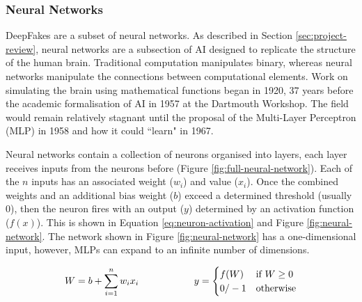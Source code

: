 \subsubsection{Neural Networks}

DeepFakes are a subset of neural networks. As described in Section \ref{sec:project-review}, neural networks are a subsection of AI designed to replicate the structure of the human brain\cite{islam2019overview}. Traditional computation manipulates binary, whereas neural networks manipulate the connections between computational elements. Work on simulating the brain using mathematical functions began in 1920\cite{brush1967history}, 37 years before the academic formalisation of AI in 1957 at the Dartmouth Workshop\cite{crevier1993ai}. The field would remain relatively stagnant until the proposal of the Multi-Layer Perceptron (MLP) in 1958\cite{rosenblatt1958perceptron} and how it could ``learn" in 1967\cite{ivakhnenko1967cybernetics}.

Neural networks contain a collection of neurons organised into layers, each layer receives inputs from the neurons before (Figure \ref{fig:full-neural-network}). Each of the $n$ inputs has an associated weight ($w_i$) and value ($x_i$). Once the combined weights and an additional bias weight ($b$) exceed a determined threshold (usually 0), then the neuron fires with an output ($y$) determined by an activation function ($f(x)$). This is shown in Equation \ref{eq:neuron-activation} and Figure \ref{fig:neural-network}. The network shown in Figure \ref{fig:neural-network} has a one-dimensional input, however, MLPs can expand to an infinite number of dimensions.

\begin{equation}
\label{eq:neuron-activation}
    \begin{array}{c@{\hspace{2cm}}c}
        W = b+\displaystyle\sum_{i=1}^{n} w_ix_i  &
        y = \begin{cases}
            f(W) & \text{if } W \geq 0  \\
            0/-1 & \text{otherwise}
        \end{cases}
    \end{array}
\end{equation}

